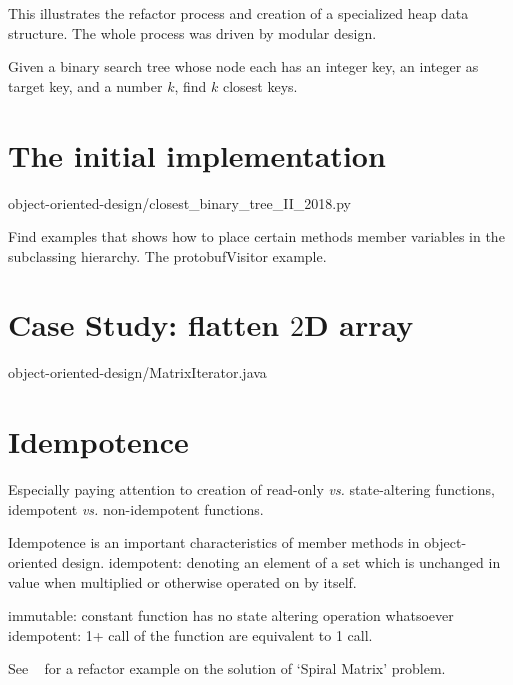 This illustrates the refactor process and creation of a specialized heap data structure.
The whole process was driven by modular design.

Given a binary search tree whose node each has an integer key, an integer as target key, and a
number $k$, find $k$ closest keys.

\section{The initial implementation}


{object-oriented-design/closest_binary_tree_II_2018.py}

Find examples that shows how to place certain methods member variables in the subclassing
hierarchy.
The protobufVisitor example.

\begin{clisting}
    
\end{clisting}

\section{Case Study: flatten $2$D array}\label{sec:caseStudy:FlattenArray}


{object-oriented-design/MatrixIterator.java}

\section{Idempotence}\label{sec:idempotence}

Especially paying attention to creation
of read-only  \textit{vs.} state-altering functions,
idempotent  \textit{vs.} non-idempotent functions.

Idempotence is an important characteristics of member methods in object-oriented design.
idempotent: denoting an element of a set which is unchanged in value when multiplied or otherwise operated on by itself.

immutable: constant function has no state altering operation whatsoever
idempotent: 1+ call of the function are equivalent to 1 call.

See ~ for a refactor example on the solution of `Spiral Matrix' problem.


